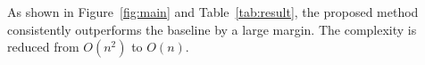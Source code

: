 As shown in Figure~\ref{fig:main} and Table~\ref{tab:result}, the proposed method consistently outperforms the baseline by a large margin. The complexity is reduced from $O(n^2)$ to $O(n)$.
